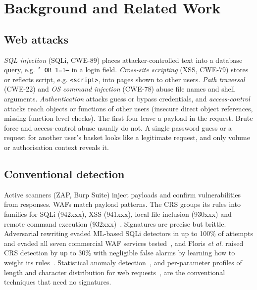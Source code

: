 \documentclass[conference]{IEEEtran}
\begin{document}
\section{Background and Related Work}
\subsection{Web attacks}
\emph{SQL injection} (SQLi, CWE-89) places attacker-controlled text into a database query, e.g.
\texttt{' OR 1=1--} in a login field. \emph{Cross-site scripting} (XSS, CWE-79) stores or reflects
script, e.g. \texttt{<script>}, into pages shown to other users. \emph{Path traversal} (CWE-22) and
\emph{OS command injection} (CWE-78) abuse file names and shell arguments. \emph{Authentication}
attacks guess or bypass credentials, and \emph{access-control} attacks reach objects or functions
of other users (insecure direct object references, missing function-level checks). The first
four leave a payload in the request. Brute force and access-control abuse usually do not. A
single password guess or a request for another user's basket looks like a legitimate request,
and only volume or authorisation context reveals it.

\subsection{Conventional detection}
Active scanners (ZAP, Burp Suite) inject payloads and confirm vulnerabilities from responses.
WAFs match payload patterns. The CRS groups its rules into families for SQLi (942xxx), XSS (941xxx),
local file inclusion (930xxx) and remote command execution (932xxx)~\cite{crs}. Signatures are precise but
brittle. Adversarial rewriting evaded ML-based SQLi detectors in up to 100\% of attempts and
evaded all seven commercial WAF services tested~\cite{qu2024}, and Floris \emph{et al.} raised CRS
detection by up to 30\% with negligible false alarms by learning how to weight its rules~\cite{floris2025}.
Statistical anomaly detection~\cite{denning1987}, and per-parameter profiles of length and
character distribution for web requests~\cite{kruegel2003}, are the conventional techniques that
need no signatures.
\end{document}
